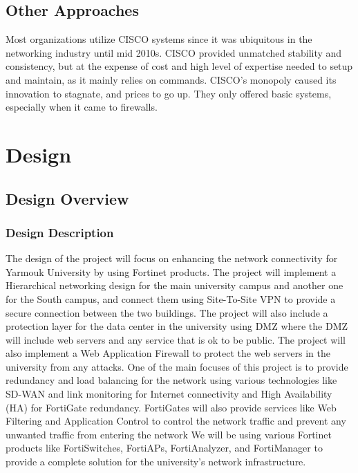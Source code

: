 \documentclass[12pt]{report}
\begin{document}
\section{Other Approaches}
Most organizations utilize CISCO systems since it was ubiquitous in the networking industry until mid 2010s. CISCO provided unmatched stability and consistency, but at the expense of cost and high level of expertise needed to setup and maintain, as it mainly relies on commands. CISCO's monopoly caused its innovation to stagnate, and prices to go up. They only offered basic systems, especially when it came to firewalls.


\chapter{Design}

\section{Design Overview}
\subsection{Design Description}
The design of the project will focus on enhancing the network connectivity for Yarmouk University by using Fortinet products. The project will implement a Hierarchical networking design for the main university campus and another one for the South campus, and connect them using Site-To-Site VPN to provide a secure connection between the two buildings. The project will also include a protection layer for the data center in the university using DMZ where the DMZ will include web servers and any service that is ok to be public. The project will also implement a Web Application Firewall to protect the web servers in the university from any attacks. One of the main focuses of this project is to provide redundancy and load balancing for the network using various technologies like SD-WAN and link monitoring for Internet connectivity and High Availability (HA) for FortiGate redundancy. FortiGates will also provide services like Web Filtering and Application Control to control the network traffic and prevent any unwanted traffic from entering the network We will be using various Fortinet products like FortiSwitches, FortiAPs, FortiAnalyzer, and FortiManager to provide a complete solution for the university's network infrastructure.
\end{document}
